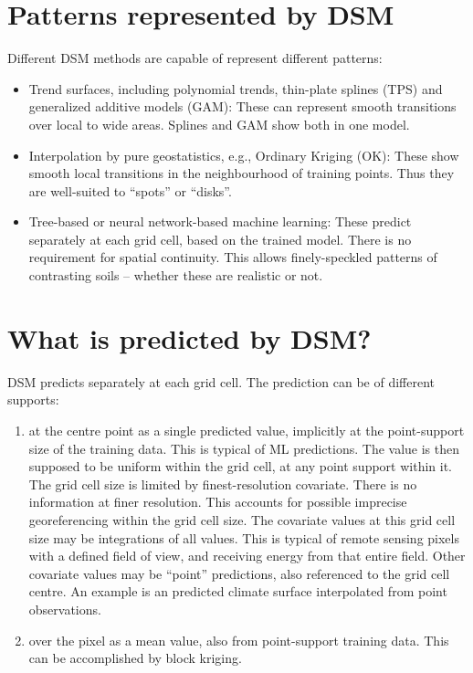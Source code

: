 \documentclass[soil, manuscript]{copernicus}
\begin{document}
\section{Patterns represented by DSM}

\par
Different DSM methods are capable of represent different patterns:

\begin{itemize}
\item Trend surfaces, including polynomial trends, thin-plate splines (TPS) and generalized additive models (GAM): These can represent smooth transitions over local to wide areas.  Splines and GAM show both in one model.
\item Interpolation by pure geostatistics, e.g., Ordinary Kriging (OK): These show smooth local transitions in the neighbourhood of training points. Thus they are well-suited to ``spots'' or ``disks''.
\item Tree-based or neural network-based machine learning: These predict separately at each grid cell, based on the trained model. There is no requirement for spatial continuity.  This allows finely-speckled patterns of contrasting soils -- whether these are realistic or not.
\end{itemize}

\section{What is predicted by DSM?}

DSM predicts separately at each grid cell. The prediction can be of different supports:

\begin{enumerate}
\item at the centre point as a single predicted value, implicitly at the point-support size of the training data. This is typical of ML predictions.
  The value is then supposed to be uniform within the grid cell, at any point support within it.
%
  The grid cell size is limited by finest-resolution covariate.
  There is no information at finer resolution.
  This accounts for possible imprecise georeferencing within the grid cell size.
  The covariate values at this grid cell size may be integrations of all values. This is typical of remote sensing pixels with a defined field of view, and receiving energy from that entire field.
  Other covariate values may be ``point'' predictions, also referenced to the grid cell centre. An example is an predicted climate surface interpolated from point observations.
\item over the pixel as a mean value, also from point-support training data. This can be accomplished by block kriging.
\end{enumerate}
\end{document}
